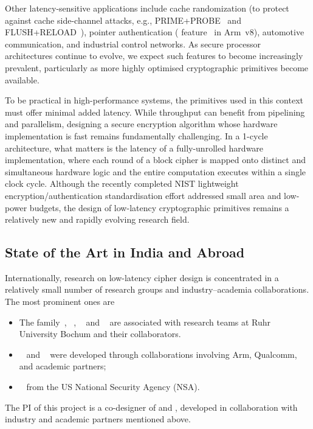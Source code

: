 Other latency-sensitive applications include cache randomization (to protect against cache side-channel attacks, e.g., \textsf{PRIME+PROBE}~\cite{DBLP:journals/iacr/OsvikST05} and \textsf{FLUSH+RELOAD}~\cite{DBLP:conf/uss/YaromF14}), pointer authentication ( feature~\cite{ARMv8-A-2016-additions} in Arm~v8), automotive communication, and industrial control networks.
As secure processor architectures continue to evolve, we expect such features to become increasingly prevalent, particularly as more highly optimised cryptographic primitives become available.

To be practical in high-performance systems, the primitives used in this context must offer minimal added latency.
While throughput can benefit from pipelining and parallelism, designing a secure encryption algorithm whose hardware implementation is fast remains fundamentally challenging.
In a 1-cycle architecture, what matters is the latency of a fully-unrolled hardware implementation, where each round of a block cipher is mapped onto distinct and simultaneous hardware logic and the entire computation executes within a single clock cycle.
Although the recently completed NIST lightweight encryption/authentication standardisation effort addressed small area and low-power budgets, the design of low-latency cryptographic primitives remains a relatively new and rapidly evolving research field.

\subsection{State of the Art in India and Abroad}

Internationally, research on low-latency cipher design is concentrated in a relatively small number of research groups and industry–academia collaborations. The most prominent ones are
\begin{itemize}
    \item The  family~\cite{DBLP:conf/asiacrypt/BorghoffCGKKKLNPRRTY12,DBLP:conf/sacrypt/BozilovEKLLMNRT20}, ~\cite{DBLP:conf/crypto/BeierleJKL0PSSS16}, ~\cite{DBLP:conf/uss/CanaleGLTTU23} and ~ are associated with research teams at Ruhr University Bochum and their collaborators. 
    \item {}~\cite{DBLP:journals/tosc/Avanzi17} and ~ were developed through collaborations involving Arm, Qualcomm, and academic partners; 
    \item {}~\cite{cryptoeprint:2024/1240} from the US National Security Agency (NSA).
\end{itemize}
The PI of this project is a co-designer of  and , developed in collaboration with industry and academic partners mentioned above.

